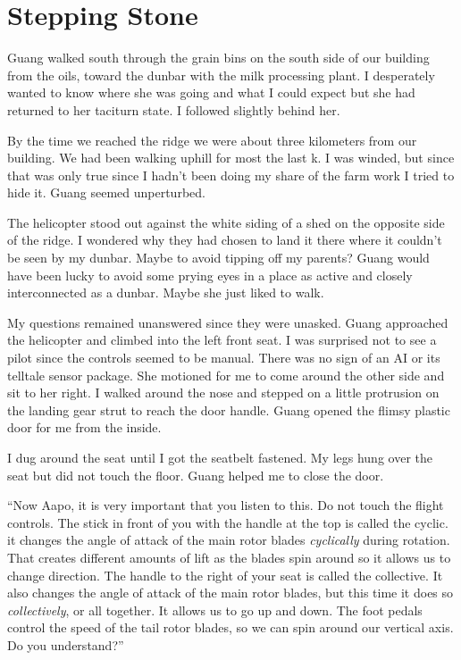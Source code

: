%
%

\chapter{Stepping Stone}

Guang walked south through the grain bins on the south side of our building from the oils, toward the dunbar with the milk processing plant. I desperately wanted to know where she was going and what I could expect but she had returned to her taciturn state. I followed slightly behind her.

By the time we reached the ridge we were about three kilometers from our building. We had been walking uphill for most the last k. I was winded, but since that was only true since I hadn't been doing my share of the farm work I tried to hide it. Guang seemed unperturbed.

The helicopter stood out against the white siding of a shed on the opposite side of the ridge. I wondered why they had chosen to land it there where it couldn't be seen by my dunbar. Maybe to avoid tipping off my parents? Guang would have been lucky to avoid some prying eyes in a place as active and closely interconnected as a dunbar. Maybe she just liked to walk.

My questions remained unanswered since they were unasked. Guang approached the helicopter and climbed into the left front seat. I was surprised not to see a pilot since the controls seemed to be manual. There was no sign of an AI or its telltale sensor package. She motioned for me to come around the other side and sit to her right. I walked around the nose and stepped on a little protrusion on the landing gear strut to reach the door handle. Guang opened the flimsy plastic door for me from the inside.

I dug around the seat until I got the seatbelt fastened. My legs hung over the seat but did not touch the floor. Guang helped me to close the door.

``Now Aapo, it is very important that you listen to this. Do not touch the flight controls. The stick in front of you with the handle at the top is called the cyclic. it changes the angle of attack of the main rotor blades \textit{cyclically} during rotation. That creates different amounts of lift as the blades spin around so it allows us to change direction. The handle to the right of your seat is called the collective. It also changes the angle of attack of the main rotor blades, but this time it does so \textit{collectively}, or all together. It allows us to go up and down. The foot pedals control the speed of the tail rotor blades, so we can spin around our vertical axis. Do you understand?''

